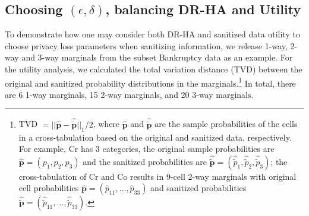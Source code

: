 \documentclass[10pt,journal,compsoc]{IEEEtran}
\begin{document}
\vspace{-6pt} 
\subsection{Choosing $(\epsilon,\delta)$, balancing DR-HA and Utility } \label{sec:utility}\vspace{-3pt}
To demonstrate how one may consider both DR-HA and sanitized data utility to choose privacy loss parameters when sanitizing information, we release 1-way, 2-way and 3-way marginals from the subset Bankruptcy data as an example. 
For the utility analysis, we calculated the total variation distance (TVD) between the original and sanitized probability distributions in the marginals.\footnote{TVD $=||\hat{\mathbf{p}}-\hat{\tilde{\mathbf{p}}}||_1/2$, where $\hat{\mathbf{p}}$ and  $\hat{\tilde{\mathbf{p}}}$ are the sample probabilities of the cells in a cross-tabulation based on the original and sanitized data, respectively.  For example, Cr has 3 categories, the original sample probabilities are $\hat{\mathbf{p}}\!=\!(p_1,p_2,p_3)$  and the sanitized probabilities are $\hat{\tilde{\mathbf{p}}}\!=\!(\hat{\tilde{p}}_1,\hat{\tilde{p}}_2,\hat{\tilde{p}}_3)$; the cross-tabulation of Cr and Co results in 9-cell 2-way marginals with original cell probabilities $\hat{\mathbf{p}}\!=\!(\hat{p}_{11},\ldots,\hat{p}_{33})$ and sanitized probabilities $\hat{\tilde{\mathbf{p}}}\!=\!(\hat{\tilde{p}}_{11},\ldots,\hat{\tilde{p}}_{33})$.}  In total, there are 6 1-way marginals, 15 2-way marginals, and 20 3-way marginals. 
\end{document}
